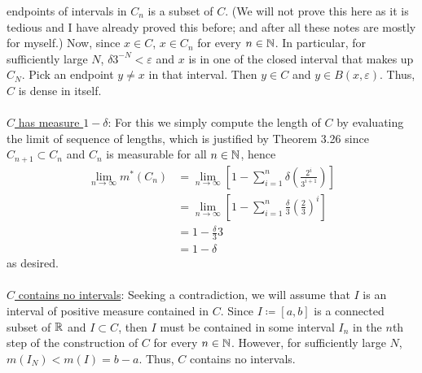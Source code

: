 \begin{solution}
{    endpoints of intervals in $C_n$ is a subset of $C$}. (We will not prove
  this here as it is tedious and I have already proved this before; and
  after all these notes are mostly for myself.) Now, since $x\in C$,
  $x\in C_n$ for every $n\in\mathbb{N}$. In particular, for sufficiently large
  $N$, $\delta 3^{-N}<\varepsilon$ and $x$ is in one of the closed interval
  that makes up $C_N$. Pick an endpoint $y\neq x$ in that interval. Then
  $y\in C$ and $y\in B(x,\varepsilon)$. Thus, $C$ is dense in itself.
  \\\\
  \underline{$C$ has measure $1-\delta$}: For this we simply compute the
  length of $C$ by evaluating the limit of sequence of lengths, which is
  justified by Theorem 3.26 since $C_{n+1}\subset C_n$ and $C_n$ is
  measurable for all $n\in\mathbb{N}$, hence
  \begin{align*}
    \lim_{n\to\infty}m^*(C_n)
    &=\lim_{n\to\infty}
      \left[1-\sum_{i=1}^n\delta\left(\frac{2^i}{3^{i+1}}\right)\right]\\
    &=\lim_{n\to\infty}
      \left[1-\sum_{i=1}^n\frac{\delta}{3}\left(\frac{2}{3}\right)^i\right]\\
    &=1-\frac{\delta}{3}3\\
    &=1-\delta
  \end{align*}
  as desired.
  \\\\
  \underline{$C$ contains no intervals}: Seeking a contradiction, we will
  assume that $I$ is an interval of positive measure contained in
  $C$. Since $I\coloneq[a,b]$ is a connected subset of $\mathbb{R}$ and
  $I\subset C$, then $I$ must be contained in some interval $I_n$ in the
  $n$th step of the construction of $C$ for every $n\in\mathbb{N}$. However, for
  sufficiently large $N$, $m(I_N)<m(I)=b-a$. Thus, $C$ contains no
  intervals.
\end{solution}

